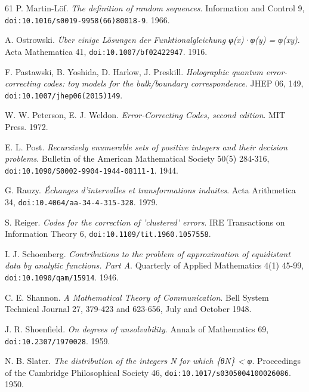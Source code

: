 \begin{thebibliography}{61}
P. Martin-Löf. \emph{The definition of random sequences}. Information and Control 9, \texttt{doi:10.1016/\allowbreak{}s0019-9958(66)80018-9}. 1966.

A. Ostrowski. \emph{Über einige Lösungen der Funktionalgleichung φ(x)·φ(y) = φ(xy)}. Acta Mathematica 41, \texttt{doi:10.1007/\allowbreak{}bf02422947}. 1916.

F. Pastawski, B. Yoshida, D. Harlow, J. Preskill. \emph{Holographic quantum error-correcting codes: toy models for the bulk/boundary correspondence}. JHEP 06, 149, \texttt{doi:10.1007/\allowbreak{}jhep06(2015)149}.

W. W. Peterson, E. J. Weldon. \emph{Error-Correcting Codes, second edition}. MIT Press. 1972.

E. L. Post. \emph{Recursively enumerable sets of positive integers and their decision problems}. Bulletin of the American Mathematical Society 50(5) 284-316, \texttt{doi:10.1090/\allowbreak{}S0002-9904-1944-08111-1}. 1944.

G. Rauzy. \emph{Échanges d'intervalles et transformations induites}. Acta Arithmetica 34, \texttt{doi:10.4064/\allowbreak{}aa-34-4-315-328}. 1979.

S. Reiger. \emph{Codes for the correction of 'clustered' errors}. IRE Transactions on Information Theory 6, \texttt{doi:10.1109/\allowbreak{}tit.1960.1057558}.

I. J. Schoenberg. \emph{Contributions to the problem of approximation of equidistant data by analytic functions. Part A}. Quarterly of Applied Mathematics 4(1) 45-99, \texttt{doi:10.1090/\allowbreak{}qam/\allowbreak{}15914}. 1946.

C. E. Shannon. \emph{A Mathematical Theory of Communication}. Bell System Technical Journal 27, 379-423 and 623-656, July and October 1948.

J. R. Shoenfield. \emph{On degrees of unsolvability}. Annals of Mathematics 69, \texttt{doi:10.2307/\allowbreak{}1970028}. 1959.

N. B. Slater. \emph{The distribution of the integers N for which \{θN\} < φ}. Proceedings of the Cambridge Philosophical Society 46, \texttt{doi:10.1017/\allowbreak{}s0305004100026086}. 1950.


\end{thebibliography}
